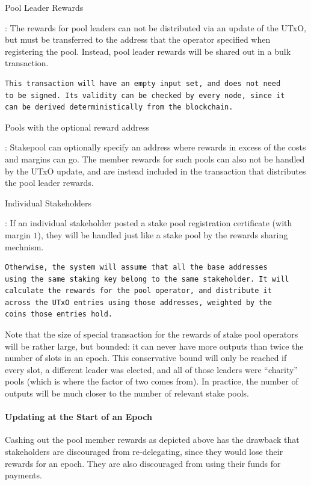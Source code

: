 \documentclass[11pt,a4paper]{article}
\begin{document}
Pool Leader Rewards

: The rewards for pool leaders can not be distributed via an update of
the UTxO, but must be transferred to the address that the operator
specified when registering the pool. Instead, pool leader rewards will
be shared out in a bulk transaction.

\begin{verbatim}
This transaction will have an empty input set, and does not need
to be signed. Its validity can be checked by every node, since it
can be derived deterministically from the blockchain.
\end{verbatim}

Pools with the optional reward address

: Stakepool can optionally specify an address where rewards in excess of
the costs and margins can go. The member rewards for such pools can also
not be handled by the UTxO update, and are instead included in the
transaction that distributes the pool leader rewards.

Individual Stakeholders

: If an individual stakeholder posted a stake pool registration
certificate (with margin \(1\)), they will be handled just like a stake
pool by the rewards sharing mechnism.

\begin{verbatim}
Otherwise, the system will assume that all the base addresses
using the same staking key belong to the same stakeholder. It will
calculate the rewards for the pool operator, and distribute it
across the UTxO entries using those addresses, weighted by the
coins those entries hold.
\end{verbatim}

Note that the size of special transaction for the rewards of stake pool
operators will be rather large, but bounded: it can never have more
outputs than twice the number of slots in an epoch. This conservative
bound will only be reached if every slot, a different leader was
elected, and all of those leaders were ``charity'' pools (which is where
the factor of two comes from). In practice, the number of outputs will
be much closer to the number of relevant stake pools.

\paragraph{Updating at the Start of an
Epoch}\label{updating-at-the-start-of-an-epoch}

Cashing out the pool member rewards as depicted above has the drawback
that stakeholders are discouraged from re-delegating, since they would
lose their rewards for an epoch. They are also discouraged from using
their funds for payments.
\end{document}
